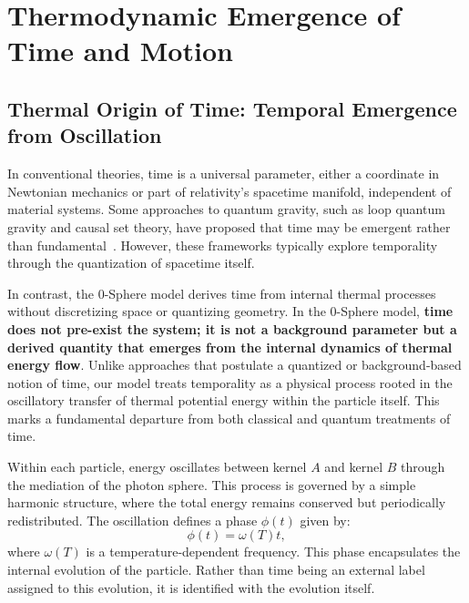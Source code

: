 \documentclass[%
 reprint,
 amsmath,amssymb,
 aps,
]{revtex4-1}
\numberwithin{equation}{section}%
\begin{document}
\section{Thermodynamic Emergence of Time and Motion}
\label{sec:thermodynamic_emergence}

\subsection{Thermal Origin of Time: Temporal Emergence from Oscillation}
\label{subsec:thermal_origin_time}

In conventional theories, time is a universal parameter, either a coordinate in Newtonian mechanics or part of relativity's spacetime manifold, independent of material systems. Some approaches to quantum gravity, such as loop quantum gravity and causal set theory, have proposed that time may be emergent rather than fundamental~\cite{rovelli1991}. However, these frameworks typically explore temporality through the quantization of spacetime itself. 

In contrast, the 0-Sphere model derives time from internal thermal processes without discretizing space or quantizing geometry. In the 0-Sphere model, \textbf{time does not pre-exist the system; it is not a background parameter but a derived quantity that emerges from the internal dynamics of thermal energy flow}. Unlike approaches that postulate a quantized or background-based notion of time, our model treats temporality as a physical process rooted in the oscillatory transfer of thermal potential energy within the particle itself. This marks a fundamental departure from both classical and quantum treatments of time.

Within each particle, energy oscillates between kernel $A$ and kernel $B$ through the mediation of the photon sphere. This process is governed by a simple harmonic structure, where the total energy remains conserved but periodically redistributed. The oscillation defines a phase $\phi(t)$ given by:
\begin{equation} \label{eq:phase_definition}
\phi(t) = \omega(T) t,
\end{equation}
where $\omega(T)$ is a temperature-dependent frequency. This phase encapsulates the internal evolution of the particle. Rather than time being an external label assigned to this evolution, it is identified with the evolution itself.
\end{document}
